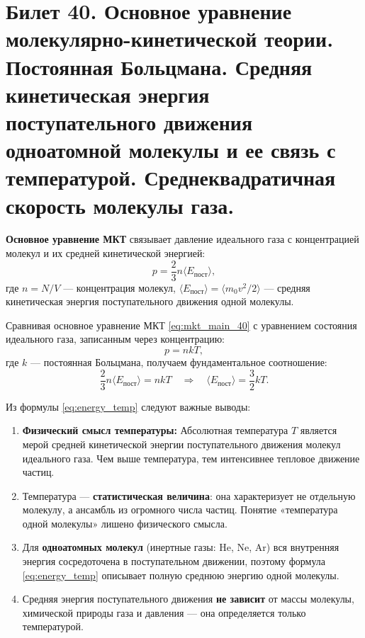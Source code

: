 \section{Билет 40. Основное уравнение молекулярно-кинетической теории. Постоянная Больцмана. Средняя кинетическая энергия поступательного движения одноатомной молекулы и ее связь с температурой. Среднеквадратичная скорость молекулы газа.}

\begin{definition}
\textbf{Основное уравнение МКТ} связывает давление идеального газа с концентрацией молекул и их средней кинетической энергией:
\begin{equation}
    p = \frac{2}{3} n \langle E_{\text{пост}} \rangle, \label{eq:mkt_main_40}
\end{equation}
где $n = N/V$ --- концентрация молекул, $\langle E_{\text{пост}} \rangle = \langle m_0 v^2 / 2 \rangle$ --- средняя кинетическая энергия поступательного движения одной молекулы.
\end{definition}

\begin{theorem}
Сравнивая основное уравнение МКТ \eqref{eq:mkt_main_40} с уравнением состояния идеального газа, записанным через концентрацию:
\begin{equation}
    p = n k T, \label{eq:ideal_concentration}
\end{equation}
где $k$ --- постоянная Больцмана, получаем фундаментальное соотношение:
\begin{equation}
    \frac{2}{3} n \langle E_{\text{пост}} \rangle = n k T \quad \Rightarrow \quad \langle E_{\text{пост}} \rangle = \frac{3}{2} k T. \label{eq:energy_temp}
\end{equation}
\end{theorem}

\begin{property}
Из формулы \eqref{eq:energy_temp} следуют важные выводы:
\begin{enumerate}
    \item \textbf{Физический смысл температуры:} Абсолютная температура $T$ является мерой средней кинетической энергии поступательного движения молекул идеального газа. Чем выше температура, тем интенсивнее тепловое движение частиц.
    \item Температура --- \textbf{статистическая величина}: она характеризует не отдельную молекулу, а ансамбль из огромного числа частиц. Понятие «температура одной молекулы» лишено физического смысла.
    \item Для \textbf{одноатомных молекул} (инертные газы: He, Ne, Ar) вся внутренняя энергия сосредоточена в поступательном движении, поэтому формула \eqref{eq:energy_temp} описывает полную среднюю энергию одной молекулы.
    \item Средняя энергия поступательного движения \textbf{не зависит} от массы молекулы, химической природы газа и давления --- она определяется только температурой.
\end{enumerate}
\end{property}

